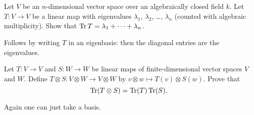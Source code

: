 \section{\problemhead}

\begin{problem}
	Let $V$ be an $n$-dimensional vector space
	over an algebraically closed field $k$.
	Let $T \colon V \to V$ be a linear map with
	eigenvalues $\lambda_1$, $\lambda_2$, \dots, $\lambda_n$
	(counted with algebraic multiplicity).
	Show that $\operatorname{Tr} T = \lambda_1 + \dots + \lambda_n$.
	\begin{hint}
		Follows by writing $T$ in an eigenbasis:
		then the diagonal entries are the eigenvalues.
	\end{hint}
\end{problem}

\begin{dproblem}
	Let $T \colon V \to V$ and $S \colon W \to W$ be linear maps
	of finite-dimensional vector spaces $V$ and $W$.
	Define $T \otimes S \colon V \otimes W \to V \otimes W$
	by $v \otimes w \mapsto T(v) \otimes S(w)$.
	Prove that \[ \operatorname{Tr}(T \otimes S) = \operatorname{Tr}(T) \operatorname{Tr}(S). \]
	\begin{hint}
		Again one can just take a basis.
	\end{hint}
\end{dproblem}

